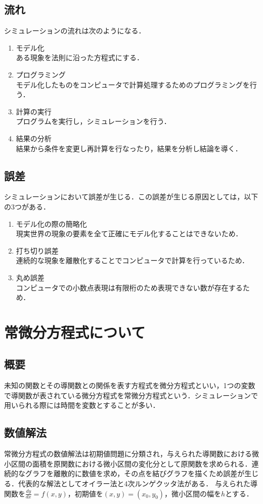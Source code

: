 \documentclass[a4paper, 12pt]{ltjsarticle}
\begin{document}
\subsection{流れ}
シミュレーションの流れは次のようになる．
\begin{enumerate}[label=(\roman*)]
\item モデル化\\
ある現象を法則に沿った方程式にする．
\item プログラミング\\
モデル化したものをコンピュータで計算処理するためのプログラミングを行う．
\item 計算の実行\\
プログラムを実行し，シミュレーションを行う．
\item 結果の分析\\
結果から条件を変更し再計算を行なったり，結果を分析し結論を導く．
\end{enumerate}
\subsection{誤差}
シミュレーションにおいて誤差が生じる．この誤差が生じる原因としては，以下の3つがある．
\begin{enumerate}[label=(\alph*)]
\item モデル化の際の簡略化\\
現実世界の現象の要素を全て正確にモデル化することはできないため．
\item 打ち切り誤差\\
連続的な現象を離散化することでコンピュータで計算を行っているため．
\item 丸め誤差\\
コンピュータでの小数点表現は有限桁のため表現できない数が存在するため．
\end{enumerate}
\clearpage
\section{常微分方程式について}
\subsection{概要}
未知の関数とその導関数との関係を表す方程式を微分方程式といい，1つの変数で導関数が表されている微分方程式を常微分方程式という．シミュレーションで用いられる際には時間を変数とすることが多い．
\subsection{数値解法}
常微分方程式の数値解法は初期値問題に分類され，与えられた導関数における微小区間の面積を原関数における微小区間の変化分として原関数を求められる．連続的なグラフを離散的に数値を求め，その点を結びグラフを描くため誤差が生じる．代表的な解法としてオイラー法と4次ルンゲクッタ法がある．
与えられた導関数を$\frac{dy}{dx}=f(x,y)$，初期値を$(x,y)=(x_0,y_0)$，微小区間の幅を$h$とする．
\end{document}
